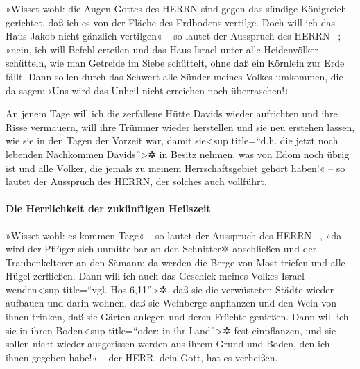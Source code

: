 »Wisset wohl: die Augen Gottes des HERRN sind gegen das
sündige Königreich gerichtet, daß ich es von der Fläche des Erdbodens
vertilge. Doch will ich das Haus Jakob nicht gänzlich vertilgen« -- so
lautet der Ausspruch des HERRN --; »nein, ich will Befehl
erteilen und das Haus Israel unter alle Heidenvölker schütteln, wie man
Getreide im Siebe schüttelt, ohne daß ein Körnlein zur Erde fällt.
Dann sollen durch das Schwert alle Sünder meines Volkes
umkommen, die da sagen: ›Uns wird das Unheil nicht erreichen noch
überraschen!‹

An jenem Tage will ich die zerfallene Hütte Davids wieder
aufrichten und ihre Risse vermauern, will ihre Trümmer wieder herstellen
und sie neu erstehen lassen, wie sie in den Tagen der Vorzeit war,
damit sie\textless sup title=``d.h. die jetzt noch
lebenden Nachkommen Davids''\textgreater✲ in Besitz nehmen, was von Edom
noch übrig ist und alle Völker, die jemals zu meinem Herrschaftsgebiet
gehört haben!« -- so lautet der Ausspruch des HERRN, der solches auch
vollführt.

\hypertarget{die-herrlichkeit-der-zukuxfcnftigen-heilszeit}{%
\paragraph{Die Herrlichkeit der zukünftigen
Heilszeit}\label{die-herrlichkeit-der-zukuxfcnftigen-heilszeit}}

»Wisset wohl: es kommen Tage« -- so lautet der Ausspruch
des HERRN --, »da wird der Pflüger sich unmittelbar an den Schnitter✲
anschließen und der Traubenkelterer an den Sämann; da werden die Berge
von Most triefen und alle Hügel zerfließen. Dann will ich
auch das Geschick meines Volkes Israel wenden\textless sup title=``vgl.
Hos 6,11''\textgreater✲, daß sie die verwüsteten Städte wieder aufbauen
und darin wohnen, daß sie Weinberge anpflanzen und den Wein von ihnen
trinken, daß sie Gärten anlegen und deren Früchte genießen.
Dann will ich sie in ihren Boden\textless sup
title=``oder: in ihr Land''\textgreater✲ fest einpflanzen, und sie
sollen nicht wieder ausgerissen werden aus ihrem Grund und Boden, den
ich ihnen gegeben habe!« -- der HERR, dein Gott, hat es verheißen.
